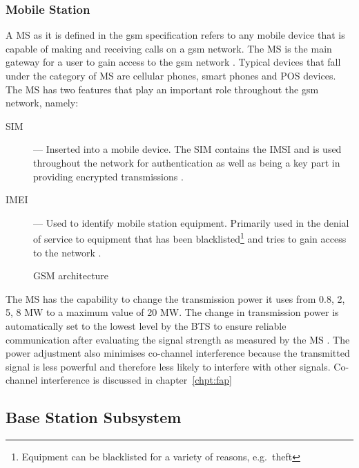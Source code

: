 \subsubsection{Mobile Station}
A \gls{MS}  as it is defined in the \gls{gsm} specification refers to any mobile device that is capable of making and receiving calls on a \gls{gsm} network.  The \gls{MS} is the main gateway 
for a user to gain access to the \gls{gsm} network \cite{Eisenblatter,GSMArchitectureProtocolsServices}. Typical devices that fall under the category of \gls{MS} are cellular phones, smart phones and \gls{POS} devices. The \gls{MS} has two features that play an important role throughout the \gls{gsm} network, namely:
\begin{description}
  \item[\gls{SIM}] --- Inserted into a mobile device. The \gls{SIM} contains the \gls{IMSI} and is used throughout the network for authentication as well as being a key part in providing encrypted transmissions \cite{Eisenblatter}.
\item[\gls{IMEI}] --- Used to identify mobile station equipment. Primarily used in the denial of service to equipment that has been blacklisted\footnote{Equipment can be blacklisted for a variety of reasons, e.g.\ theft} and tries to gain access to the network \cite{Eisenblatter}.
\end{description}
\begin{figure}[H]
	\begin{centering}
		
		\caption{GSM architecture\cite{GSMArchitectureProtocolsServices}}
		\label{fig:GSMArchitecture}
	\end{centering}
\end{figure}
The \gls{MS} has the capability to change the transmission power it uses from 0.8, 2, 5, 8 MW to a maximum value of 20 MW\cite{GSMSysEngin}. The change in transmission power is automatically set to the lowest level by the \gls{BTS} to ensure reliable communication after evaluating the signal strength as measured by the \gls{MS} \cite{GSMSysEngin,GSMArchitectureProtocolsServices}. The power adjustment also minimises co-channel interference because the transmitted signal is less powerful and therefore less likely to interfere with other signals\cite{GSMSysEngin}. Co-channel interference is discussed in chapter~\ref{chpt:fap}

\subsection{Base Station Subsystem}

